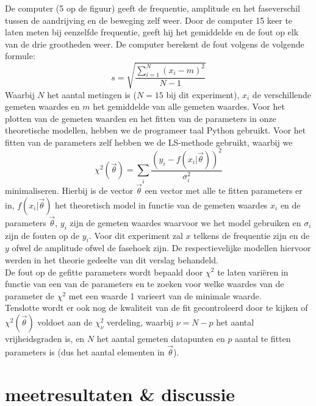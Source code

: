 \documentclass[12pt,a4]{article}
\begin{document}
De computer (5 op de figuur) geeft de frequentie, amplitude en het faseverschil tussen de aandrijving en de beweging zelf weer. Door de computer 15 keer te laten meten bij eenzelfde frequentie, geeft hij het gemiddelde en de fout op elk van de drie grootheden weer. De computer berekent de fout volgens de volgende formule:
\[ s = \sqrt{\frac{\sum_{i=1}^{N}(x_i-m)^2}{N-1}} \]
Waarbij $N$ het aantal metingen is ($N = 15$ bij dit experiment), $x_i$ de verschillende gemeten waardes en $m$ het gemiddelde van alle gemeten waardes.
Voor het plotten van de gemeten waarden en het fitten van de parameters in onze theoretische modellen, hebben we de programeer taal Python gebruikt. Voor het fitten van de parameters zelf hebben we de LS-methode gebruikt, waarbij we 
\[ \chi^2(\vec\theta) = \sum_i\frac{(y_i - f(x_i | \vec\theta))^2}{\sigma_i^2} \]
minimaliseren. Hierbij is de vector $\vec\theta$ een vector met alle te fitten parameters er in, $f(x_i |\vec\theta)$ het theoretisch model in functie van de gemeten waardes $x_i$ en de parameters $\vec\theta$, $y_i$ zijn de gemeten waardes waarvoor we het model gebruiken en $\sigma_i$ zijn de fouten op de $y_i$. Voor dit experiment zal $x$ telkens de frequentie zijn en de $y$ ofwel de amplitude ofwel de fasehoek zijn. De respectievelijke modellen hiervoor werden in het theorie gedeelte van dit verslag behandeld.\\
De fout op de gefitte parameters wordt bepaald door $\chi^2$ te laten vari\"eren in functie van een van de parameters en te zoeken voor welke waardes van de parameter de $\chi^2$ met een waarde 1 varieert van de minimale waarde.\\
Tenslotte wordt er ook nog de kwaliteit van de fit gecontroleerd door te kijken of $\chi^2(\vec\theta)$ voldoet aan de  $\chi^2_{\nu}$ verdeling, waarbij $\nu = N - p$ het aantal vrijheidsgraden is, en $N$ het aantal gemeten datapunten en $p$ aantal te fitten parameters is (dus het aantal elementen in $\vec\theta$).

\section{meetresultaten \& discussie}
\end{document}

